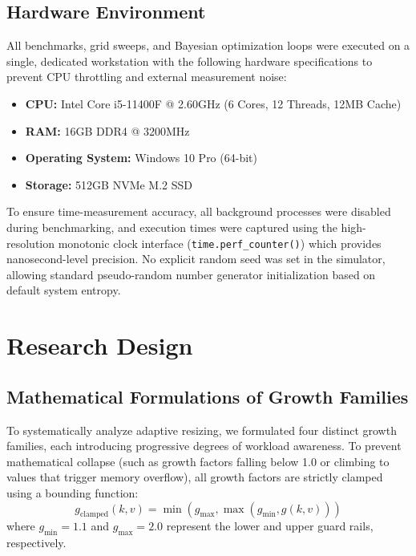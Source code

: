 \subsection{Hardware Environment}
All benchmarks, grid sweeps, and Bayesian optimization loops were executed on 
a single, dedicated workstation with the following hardware specifications to 
prevent CPU throttling and external measurement noise:
\begin{itemize}
    \item \textbf{CPU:} Intel Core i5-11400F @ 2.60GHz (6 Cores, 12 Threads, 12MB Cache)
    \item \textbf{RAM:} 16GB DDR4 @ 3200MHz
    \item \textbf{Operating System:} Windows 10 Pro (64-bit)
    \item \textbf{Storage:} 512GB NVMe M.2 SSD
\end{itemize}
To ensure time-measurement accuracy, all background processes were disabled during 
benchmarking, and execution times were captured using the high-resolution 
monotonic clock interface (\texttt{time.perf\_counter()}) which provides 
nanosecond-level precision. No explicit random seed was set in the simulator, 
allowing standard pseudo-random number generator initialization based on default 
system entropy.

\section{Research Design}

\subsection{Mathematical Formulations of Growth Families}
To systematically analyze adaptive resizing, we formulated four distinct 
growth families, each introducing progressive degrees of workload awareness. 
To prevent mathematical collapse (such as growth factors falling below 1.0 or 
climbing to values that trigger memory overflow), all growth factors are 
strictly clamped using a bounding function:
\begin{equation}
    g_{\text{clamped}}(k, v) = \min\left(g_{\max}, \max\left(g_{\min}, g(k, v)\right)\right)
\end{equation}
where $g_{\min} = 1.1$ and $g_{\max} = 2.0$ represent the lower and upper guard 
rails, respectively.

